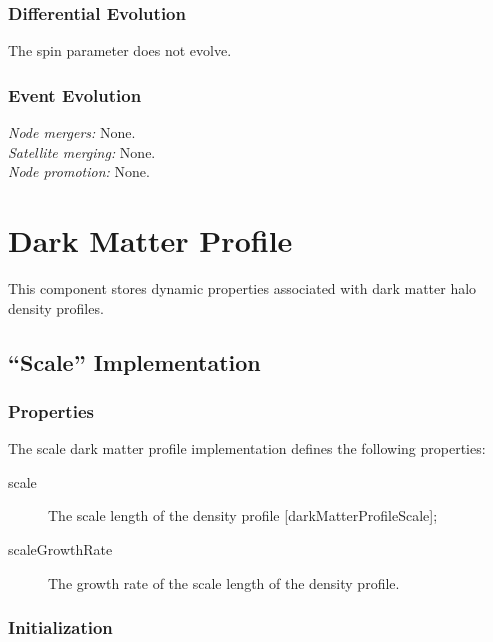 \subsubsection{Differential Evolution}

The spin parameter does not evolve.

\subsubsection{Event Evolution}

\noindent\emph{Node mergers:} None.\\

\noindent\emph{Satellite merging:} None.\\

\noindent\emph{Node promotion:} None.

\section{Dark Matter Profile}\label{sec:DarkMatterProfileComponent}

This \gls{component} stores dynamic properties associated with dark matter halo density profiles.

\subsection{``Scale'' Implementation}\label{sec:DarkMatterProfileScale}

\subsubsection{Properties}

The scale dark matter profile implementation defines the following properties:
\begin{description}
 \item [{\normalfont \ttfamily scale}] The scale length of the density profile [{\normalfont \ttfamily darkMatterProfileScale}];
 \item [{\normalfont \ttfamily scaleGrowthRate}] The growth rate of the scale length of the density profile.
\end{description}

\subsubsection{Initialization}

